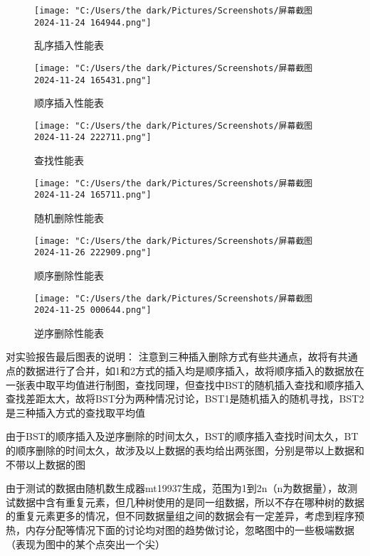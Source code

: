 \documentclass[]{article}
\begin{document}
\begin{figure}[h]
	
	\centering
	\texttt{[image: "C:/Users/the dark/Pictures/Screenshots/屏幕截图 2024-11-24 164944.png"]}
	\caption{乱序插入性能表}
	\label{fig:enter-label}

		\centering
	\texttt{[image: "C:/Users/the dark/Pictures/Screenshots/屏幕截图 2024-11-24 165431.png"]}
	\caption{顺序插入性能表}
	\label{fig:enter-label}

	\centering
\texttt{[image: "C:/Users/the dark/Pictures/Screenshots/屏幕截图 2024-11-24 222711.png"]}
\caption{查找性能表}
\label{fig:enter-label}
\end{figure}
\begin{figure}[h]
	\centering
\texttt{[image: "C:/Users/the dark/Pictures/Screenshots/屏幕截图 2024-11-24 165711.png"]}
\caption{随机删除性能表}
\label{fig:enter-label}

\end{figure}
\begin{figure}[h]
	\centering
\texttt{[image: "C:/Users/the dark/Pictures/Screenshots/屏幕截图 2024-11-26 222909.png"]}
\caption{顺序删除性能表}
\label{fig:enter-label}

\end{figure}
\begin{figure}[h]
	\centering
\texttt{[image: "C:/Users/the dark/Pictures/Screenshots/屏幕截图 2024-11-25 000644.png"]}
\caption{逆序删除性能表}
\label{fig:enter-label}
\end{figure}


对实验报告最后图表的说明：
注意到三种插入删除方式有些共通点，故将有共通点的数据进行了合并，如1和2方式的插入均是顺序插入，故将顺序插入的数据放在一张表中取平均值进行制图，查找同理，但查找中BST的随机插入查找和顺序插入查找差距太大，故将BST分为两种情况讨论，BST1是随机插入的随机寻找，BST2是三种插入方式的查找取平均值

由于BST的顺序插入及逆序删除的时间太久，BST的顺序插入查找时间太久，BT的顺序删除的时间太久，故涉及以上数据的表均给出两张图，分别是带以上数据和不带以上数据的图

由于测试的数据由随机数生成器mt19937生成，范围为1到2n（n为数据量），故测试数据中含有重复元素，但几种树使用的是同一组数据，所以不存在哪种树的数据的重复元素更多的情况，但不同数据量组之间的数据会有一定差异，考虑到程序预热，内存分配等情况下面的讨论均对图的趋势做讨论，忽略图中的一些极端数据（表现为图中的某个点突出一个尖）
\end{document}
